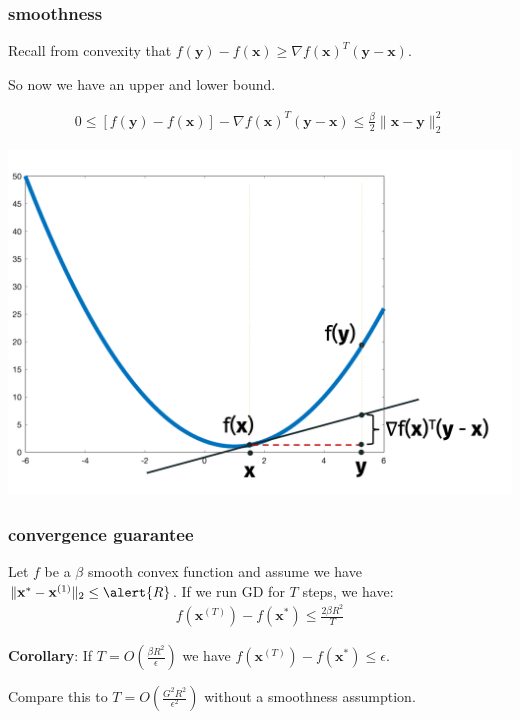 \documentclass[compress]{beamer}
\newcommand{\bv}[1]{\mathbf{#1}}
\begin{document}
\begin{frame}[t]
	\frametitle{smoothness}
	Recall from convexity that $f(\bv{y}) - f(\bv{x}) \geq \nabla f(\bv{x})^T(\bv{y} - \bv{x})$.
	\begin{center}
		\alert{So now we have an upper and lower bound.}
	\end{center}
\vspace{-1em}
	\begin{align*}
		0 \leq \left[f(\bv{y}) - f(\bv{x})\right] - \nabla f(\bv{x})^T(\bv{y} - \bv{x}) \leq \frac{\beta}{2}\|\bv{x} - \bv{y}\|_2^2
	\end{align*}
\vspace{-2em}
\begin{center}
	\includegraphics[width=.75\textwidth]{smoothness_image.png}
\end{center}	
\end{frame}

\begin{frame}[t]
	\frametitle{convergence guarantee}
	\begin{theorem}
		Let $f$ be a \alert{$\beta$} smooth convex function and assume we have $\|\bv{x}^{*} - \bv{x}^{(1)}\|_2 \leq \alert{R}$. If we run GD for $T$ steps, we have:
		\begin{align*}
			f(\bv{x}^{(T)}) - f(\bv{x}^*) \leq \frac{2\beta R^2}{T} 
		\end{align*} 
	\end{theorem}
	\textbf{Corollary}: If \alert{$T = O\left(\frac{\beta R^2}{\epsilon}\right)$} we have $f(\bv{x}^{(T)}) - f(\bv{x}^*) \leq \epsilon$.
	
	\vspace{1em}
		Compare this to $T = O\left(\frac{G^2 R^2}{\epsilon^2}\right)$ without  a smoothness assumption.
\end{frame}
\end{document}
